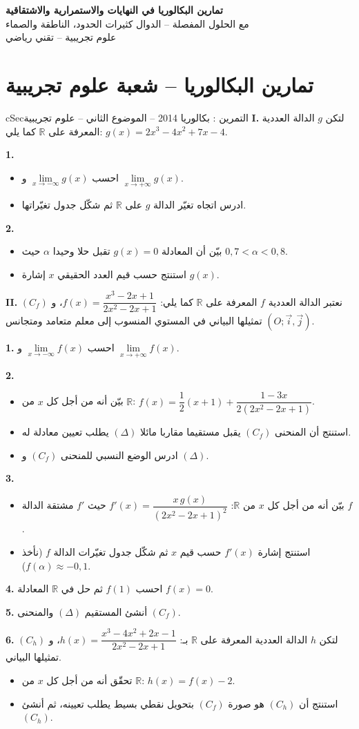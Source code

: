\documentclass[12pt,a4paper]{article}
\newenvironment{BOX}[2]{\begin{otherlanguage}{english}\begin{arbox}{#1}{#2}}{\end{arbox}\end{otherlanguage}}
\newcounter{exo}
\newenvironment{tamrin}[1]{\stepcounter{exo}\begin{BOX}{cSec}{التمرين \theexo: #1}}{\end{BOX}}
\newenvironment{LTR}{\begin{otherlanguage}{english}}{\end{otherlanguage}}
\newcommand{\R}{\mathbb{R}}
\newenvironment{sq}{\begin{itemize}[leftmargin=2.4em,itemsep=3pt]}{\end{itemize}}
\newcommand{\qa}{\item[(أ)]}\newcommand{\qb}{\item[(ب)]}\newcommand{\qc}{\item[(جـ)]}\newcommand{\qd}{\item[(د)]}\newcommand{\qe}{\item[(هـ)]}
\newcommand{\QQ}[1]{\par\smallskip\textbf{#1.} }
\begin{document}
\begin{LTR}
\begin{tcolorbox}[enhanced,colback=cSec,colframe=cSec,arc=3mm,halign=center,boxrule=0pt,top=12pt,bottom=12pt,before upper={\selectlanguage{arabic}}]
{\color{white}\fontsize{21}{27}\selectfont\bfseries تمارين البكالوريا في النهايات والاستمرارية والاشتقاقية}\\[8pt]
{\color{white}\large مع الحلول المفصلة -- الدوال كثيرات الحدود، الناطقة والصماء}\\[5pt]
{\color{white}\large علوم تجريبية -- تقني رياضي}
\end{tcolorbox}
\end{LTR}

\section{تمارين البكالوريا -- شعبة علوم تجريبية}
\begin{tamrin}{بكالوريا 2014 -- الموضوع الثاني -- علوم تجريبية}
\textbf{I.} لتكن $g$ الدالة العددية المعرفة على $\R$ كما يلي: $g(x)=2x^{3}-4x^{2}+7x-4$.
\QQ{1}
\begin{sq}
\qa احسب $\lim\limits_{x\to-\infty}g(x)$ و $\lim\limits_{x\to+\infty}g(x)$.
\qb ادرس اتجاه تغيّر الدالة $g$ على $\R$ ثم شكّل جدول تغيّراتها.
\end{sq}
\QQ{2}
\begin{sq}
\qa بيّن أن المعادلة $g(x)=0$ تقبل حلا وحيدا $\alpha$ حيث $0{,}7<\alpha<0{,}8$.
\qb استنتج حسب قيم العدد الحقيقي $x$ إشارة $g(x)$.
\end{sq}
\textbf{II.} نعتبر الدالة العددية $f$ المعرفة على $\R$ كما يلي: $f(x)=\dfrac{x^{3}-2x+1}{2x^{2}-2x+1}$، و $(C_f)$ تمثيلها البياني في المستوي المنسوب إلى معلم متعامد ومتجانس $(O;\vec i,\vec j)$.
\QQ{1} احسب $\lim\limits_{x\to-\infty}f(x)$ و $\lim\limits_{x\to+\infty}f(x)$.
\QQ{2}
\begin{sq}
\qa بيّن أنه من أجل كل $x$ من $\R$: $f(x)=\dfrac12(x+1)+\dfrac{1-3x}{2(2x^{2}-2x+1)}$.
\qb استنتج أن المنحنى $(C_f)$ يقبل مستقيما مقاربا مائلا $(\Delta)$ يطلب تعيين معادلة له.
\qc ادرس الوضع النسبي للمنحنى $(C_f)$ و $(\Delta)$.
\end{sq}
\QQ{3}
\begin{sq}
\qa بيّن أنه من أجل كل $x$ من $\R$: $f'(x)=\dfrac{x\,g(x)}{(2x^{2}-2x+1)^{2}}$ حيث $f'$ مشتقة الدالة $f$.
\qb استنتج إشارة $f'(x)$ حسب قيم $x$ ثم شكّل جدول تغيّرات الدالة $f$ (نأخذ $f(\alpha)\approx-0{,}1$).
\end{sq}
\QQ{4} احسب $f(1)$ ثم حل في $\R$ المعادلة $f(x)=0$.
\QQ{5} أنشئ المستقيم $(\Delta)$ والمنحنى $(C_f)$.
\QQ{6} لتكن $h$ الدالة العددية المعرفة على $\R$ بـ: $h(x)=\dfrac{x^{3}-4x^{2}+2x-1}{2x^{2}-2x+1}$، و $(C_h)$ تمثيلها البياني.
\begin{sq}
\qa تحقّق أنه من أجل كل $x$ من $\R$: $h(x)=f(x)-2$.
\qb استنتج أن $(C_h)$ هو صورة $(C_f)$ بتحويل نقطي بسيط يطلب تعيينه، ثم أنشئ $(C_h)$.
\end{sq}
\end{tamrin}
\end{document}
